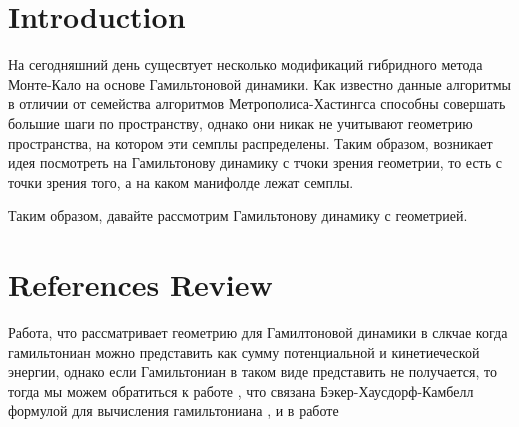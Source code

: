 \section{Introduction}
На сегодняшний день сущесвтует несколько модификаций гибридного метода Монте-Кало на основе Гамильтоновой динамики.  Как известно данные алгоритмы в отличии от семейства алгоритмов Метрополиса-Хастингса способны совершать большие шаги по пространству, однако они никак не учитывают геометрию пространства, на котором эти семплы распределены. Таким образом, возникает идея посмотреть на Гамильтонову динамику с тчоки зрения геометрии, то есть с точки зрения того, а на каком манифолде лежат семплы.

Таким образом, давайте рассмотрим Гамильтонову динамику с геометрией.

\section{References Review}
Работа, что рассматривает геометрию для Гамилтоновой динамики в слкчае когда гамильтониан можно представить как сумму потенциальной и кинетиеческой энергии\cite{RMHMC}, однако если Гамильтониан в таком виде представить не получается, то тогда мы можем обратиться к работе , что связана Бэкер-Хаусдорф-Камбелл формулой для вычисления гамильтониана , и в работе\cite{SMHMC}

